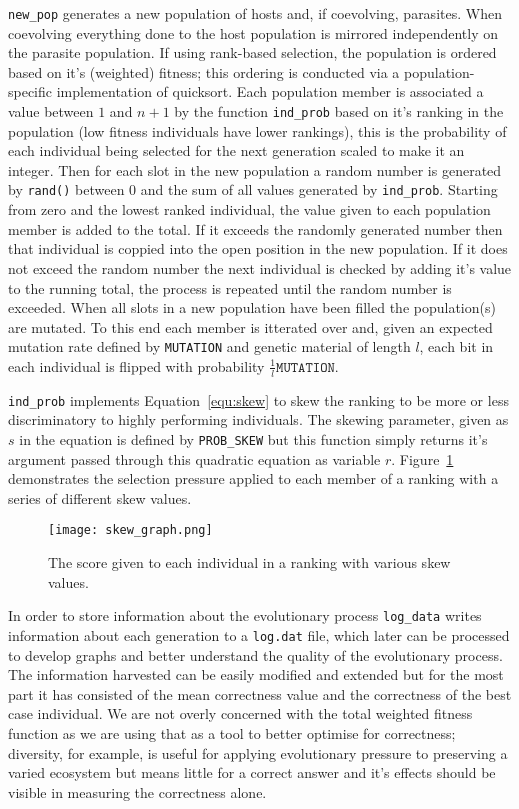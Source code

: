 \texttt{new\_pop} generates a new population of hosts and, if coevolving, parasites.
When coevolving everything done to the host population is mirrored independently
on the parasite population. If using rank-based selection, the population is ordered
based on it's (weighted) fitness; this ordering is conducted via a
population-specific implementation of quicksort. Each population member is associated
a value between $1$ and $n+1$ by the function \texttt{ind\_prob} based on it's ranking
in the population (low fitness individuals have lower rankings), this is the
probability of each individual being selected for the next generation scaled to make
it an integer. Then for each slot in the new population a
random number is generated by \texttt{rand()} between 0 and the sum of all values
generated by \texttt{ind\_prob}.
Starting from zero and the lowest ranked individual, the value given to each population
member is added to the total. If it exceeds the randomly generated number then that
individual is coppied into the open position in the new population. If it does not exceed
the random number the next individual is checked by adding it's value to the running total,
the process is repeated until the random number is exceeded. When all slots in a new
population have been filled the population(s) are mutated. To this end each member is
itterated over and, given an expected mutation rate defined by \texttt{MUTATION} and
genetic material of length $l$, each bit in each individual is flipped with probability
$\frac{1}{l}\texttt{MUTATION}$.

\texttt{ind\_prob} implements Equation~\ref{equ:skew} to skew the ranking to
be more or less discriminatory to highly performing individuals. The skewing
parameter, given as $s$ in the equation is defined by \texttt{PROB\_SKEW} but
this function simply returns it's argument passed through this quadratic equation as
variable $r$. Figure~\ref{fig:skew_plot} demonstrates the selection pressure applied
to each member of a ranking with a series of different skew values.

\begin{figure}
	\centering
	\texttt{[image: skew\_graph.png]}
	\caption{The score given to each individual in a ranking with various
	skew values.}
	\label{fig:skew_plot}
\end{figure}

In order to store information about the evolutionary process \texttt{log\_data}
writes information about each generation to a \texttt{log.dat} file, which later
can be processed to develop graphs and better understand the quality of the
evolutionary process. The information harvested can be easily modified and
extended but for the most part it has consisted of the mean correctness value
and the correctness of the best case individual.
We are not overly concerned with the total weighted fitness function as we
are using that as a tool to better optimise for correctness; diversity, for
example, is useful for applying evolutionary pressure to preserving a varied
ecosystem but means little for a correct answer and it's effects should be
visible in measuring the correctness alone.


